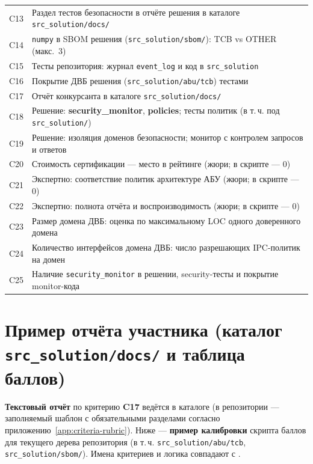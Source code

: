 \begin{longtable}{@{}p{}p{}@{}}
C13 & Раздел тестов безопасности в отчёте решения в каталоге \texttt{src\_solution/docs/} \\
C14 & \texttt{numpy} в SBOM решения (\texttt{src\_solution/sbom/}): TCB vs OTHER (макс.\ 3) \\
C15 & Тесты репозитория: журнал \texttt{event\_log} и код в \texttt{src\_solution} \\
C16 & Покрытие ДВБ решения (\texttt{src\_solution/abu/tcb}) тестами \\
C17 & Отчёт конкурсанта в каталоге \texttt{src\_solution/docs/} \\
C18 & Решение: \textbf{security\_monitor}, \textbf{policies}; тесты политик (в т.\,ч. под \texttt{src\_solution/}) \\
C19 & Решение: изоляция доменов безопасности; монитор с контролем запросов и ответов \\
C20 & Стоимость сертификации --- место в рейтинге (жюри; в скрипте --- 0) \\
C21 & Экспертно: соответствие политик архитектуре АБУ (жюри; в скрипте --- 0) \\
C22 & Экспертно: полнота отчёта и воспроизводимость (жюри; в скрипте --- 0) \\
C23 & Размер домена ДВБ: оценка по максимальному LOC одного доверенного домена \\
C24 & Количество интерфейсов домена ДВБ: число разрешающих IPC-политик на домен \\
C25 & Наличие \texttt{security\_monitor} в решении, security-тесты и покрытие monitor-кода \\
\bottomrule
\end{longtable}



\chapter{Пример отчёта участника (каталог \texttt{src\_solution/docs/} и таблица баллов)}
\label{app:example-report}

\textbf{Текстовый отчёт} по критерию \textbf{C17} ведётся в каталоге  (в репозитории --- заполняемый шаблон с обязательными разделами согласно приложению~\ref{app:criteria-rubric}). Ниже --- \textbf{пример калибровки} скрипта баллов для текущего дерева репозитория (в т.\,ч. \texttt{src\_solution/abu/tcb}, \texttt{src\_solution/sbom/}). Имена критериев и логика совпадают с .


